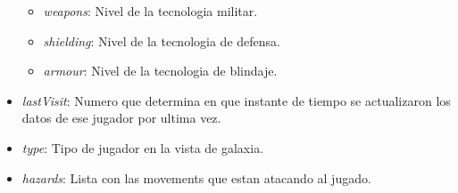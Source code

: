 \documentclass{article}
\begin{document}
\begin{itemize}[noitemsep]
\begin{itemize}[noitemsep]
        \item \textit{weapons}: Nivel de la tecnologia militar.
        \item \textit{shielding}: Nivel de la tecnologia de defensa.
        \item \textit{armour}: Nivel de la tecnologia de blindaje.
    \end{itemize}
    \item \textit{lastVisit}: Numero que determina en que instante de tiempo se actualizaron los datos de ese jugador por ultima vez.
    \item \textit{type}: Tipo de jugador en la vista de galaxia.
    \item \textit{hazards}: Lista con las movements que estan atacando al jugado.
\end{itemize}
\end{document}
